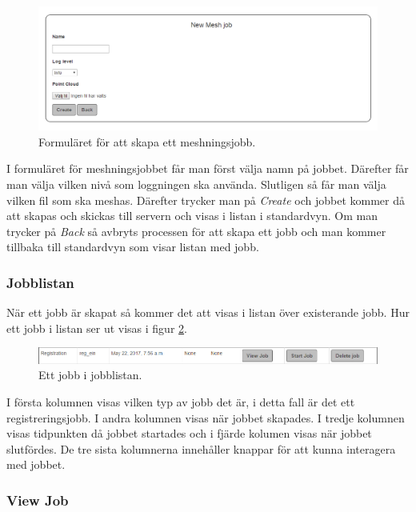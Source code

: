 \documentclass[a4paper,titlepage,12pt]{article}
\begin{document}
	\begin{figure}[H]
		\centering
		\includegraphics[width=160mm]{images/mesh_job_form.PNG}
		\caption{Formuläret för att skapa ett meshningsjobb.}
		\label{fig:mesh_job_form}
	\end{figure}

	I formuläret för meshningsjobbet får man först välja namn på jobbet. Därefter får man välja vilken nivå som loggningen ska använda. Slutligen så får man välja vilken fil som ska meshas. Därefter trycker man på \textit{Create} och jobbet kommer då att skapas och skickas till servern och visas i listan i standardvyn. Om man trycker på \textit{Back} så avbryts processen för att skapa ett jobb och man kommer tillbaka till standardvyn som visar listan med jobb.
	
	\subsubsection{Jobblistan}
	
	När ett jobb är skapat så kommer det att visas i listan över existerande jobb. Hur ett jobb i listan ser ut visas i figur \ref{fig:job_in_list}.
	
	\begin{figure}[H]
		\centering
		\includegraphics[width=160mm]{images/job_in_list.PNG}
		\caption{Ett jobb i jobblistan.}
		\label{fig:job_in_list}
	\end{figure}

	I första kolumnen visas vilken typ av jobb det är, i detta fall är det ett registreringsjobb. I andra kolumnen visas när jobbet skapades. I tredje kolumnen visas tidpunkten då jobbet startades och i fjärde kolumen visas när jobbet slutfördes. De tre sista kolumnerna innehåller knappar för att kunna interagera med jobbet.
	
	\subsubsection{View Job}
	
\end{document}
